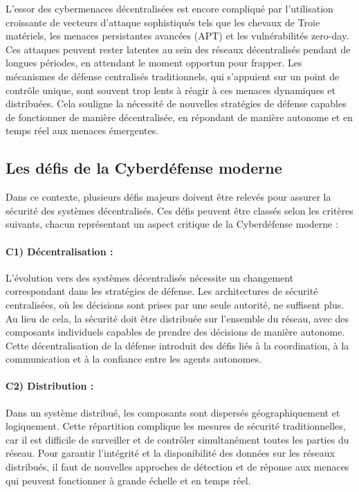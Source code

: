 L'essor des cybermenaces décentralisées est encore compliqué par l'utilisation croissante de vecteurs d'attaque sophistiqués tels que les chevaux de Troie matériels, les menaces persistantes avancées (APT) et les vulnérabilités zero-day. Ces attaques peuvent rester latentes au sein des réseaux décentralisés pendant de longues périodes, en attendant le moment opportun pour frapper. Les mécanismes de défense centralisés traditionnels, qui s'appuient sur un point de contrôle unique, sont souvent trop lents à réagir à ces menaces dynamiques et distribuées. Cela souligne la nécessité de nouvelles stratégies de défense capables de fonctionner de manière décentralisée, en répondant de manière autonome et en temps réel aux menaces émergentes.

\subsection{Les défis de la Cyberdéfense moderne}

Dans ce contexte, plusieurs défis majeurs doivent être relevés pour assurer la sécurité des systèmes décentralisés. Ces défis peuvent être classés selon les critères suivants, chacun représentant un aspect critique de la Cyberdéfense moderne :

\paragraph{C1) Décentralisation :}
L'évolution vers des systèmes décentralisés nécessite un changement correspondant dans les stratégies de défense. Les architectures de sécurité centralisées, où les décisions sont prises par une seule autorité, ne suffisent plus. Au lieu de cela, la sécurité doit être distribuée sur l'ensemble du réseau, avec des composants individuels capables de prendre des décisions de manière autonome. Cette décentralisation de la défense introduit des défis liés à la coordination, à la communication et à la confiance entre les agents autonomes.

\paragraph{C2) Distribution :}
Dans un système distribué, les composants sont dispersés géographiquement et logiquement. Cette répartition complique les mesures de sécurité traditionnelles, car il est difficile de surveiller et de contrôler simultanément toutes les parties du réseau. Pour garantir l'intégrité et la disponibilité des données sur les réseaux distribués, il faut de nouvelles approches de détection et de réponse aux menaces qui peuvent fonctionner à grande échelle et en temps réel.

